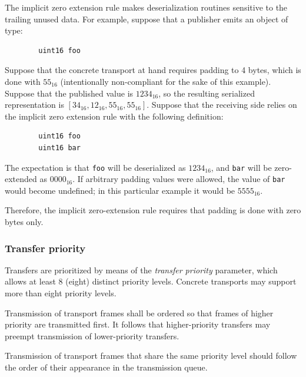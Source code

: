 \begin{remark}[breakable]
    The implicit zero extension rule makes deserialization routines sensitive to the trailing unused data.
    For example, suppose that a publisher emits an object of type:

    \begin{verbatim}
        uint16 foo
    \end{verbatim}

    Suppose that the concrete transport at hand requires padding to 4 bytes, which is done with $55_{16}$
    (intentionally non-compliant for the sake of this example).
    Suppose that the published value is $1234_{16}$,
    so the resulting serialized representation is $\left[34_{16}, 12_{16}, 55_{16}, 55_{16}\right]$.
    Suppose that the receiving side relies on the implicit zero extension rule with the following definition:

    \begin{verbatim}
        uint16 foo
        uint16 bar
    \end{verbatim}

    The expectation is that \verb|foo| will be deserialized as $1234_{16}$,
    and \verb|bar| will be zero-extended as $0000_{16}$.
    If arbitrary padding values were allowed, the value of \verb|bar| would become undefined;
    in this particular example it would be $5555_{16}$.

    Therefore, the implicit zero-extension rule requires that padding is done with zero bytes only.
\end{remark}

\subsubsection{Transfer priority}\label{sec:transport_transfer_priority}

Transfers are prioritized by means of the \emph{transfer priority} parameter,
which allows at least 8 (eight) distinct priority levels.
Concrete transports may support more than eight priority levels.

Transmission of transport frames shall be ordered so that frames of higher priority are transmitted first.
It follows that higher-priority transfers may preempt transmission of lower-priority transfers.

Transmission of transport frames that share the same priority level should follow the order of their appearance in
the transmission queue.

